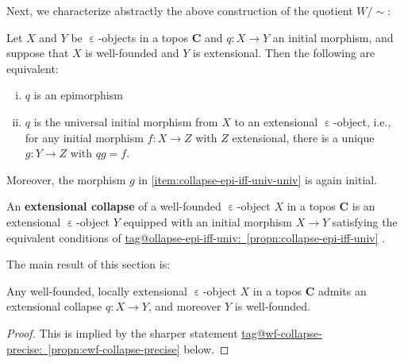\documentclass{amsart}
\makeatletter
\newcommand\bC{\mathbf{C}}
\newcommand\defword[1]{{\boldmath \textbf{#1}}}
\newcommand\ein{\mathrel{\varepsilon}}
\newcommand\unein{{\ein}}
\newcommand\unsim{{\sim}}
\newcommand\prooflabel[1]{\gdef\proof@label{#1}}
\def\proof@label{}
\newcommand\tagword[1]{\csname tag@#1\endcsname}
\def\label@tag#1:#2\@nil{#1}
\newcommand\labeltag[1]{\label@tag#1:\@nil}
\newcommand\jref[1]{%
  \texorpdfstring%
    {\hyperref[#1]{\tagword{\labeltag{#1}}~\ref*{#1}}}%
    {\tagword{\labeltag{#1}}~\ref*{#1}}%
}
\theoremstyle{definition}
\theoremstyle{remark}
\theoremstyle{plainwithref}
\makeatother
\begin{document}
Next, we characterize abstractly the above construction of the quotient \( W / \unsim \):
\prooflabel{proof:collapse-epi-iff-univ}
\begin{propn} \label{propn:collapse-epi-iff-univ}
  Let \( X \) and \( Y \) be \( \unein \)-objects in a topos \( \bC \) and \( q \colon X \to Y \) an initial morphism, and suppose that \( X \) is well-founded and \( Y \) is extensional.
  Then the following are equivalent:
  \begin{enumerate}[(i)]
  \item \( q \) is an epimorphism
  \item \label{item:collapse-epi-iff-univ-univ} \( q \) is the universal initial morphism from \( X \) to an extensional \( \unein \)-object, i.e., for any initial morphism \( f \colon X \to Z \) with \( Z \) extensional, there is a unique \( g \colon Y \to Z \) with \( q g = f \).
  \end{enumerate}
  Moreover, the morphism \( g \) in \ref{item:collapse-epi-iff-univ-univ} is again initial.
\end{propn}

\begin{defn}
  An \defword{extensional collapse} of a well-founded \( \unein \)-object \( X \) in a topos \( \bC \) is an extensional \( \unein \)-object \( Y \) equipped with an initial morphism \( X \to Y \) satisfying the equivalent conditions of \jref{propn:collapse-epi-iff-univ}.
\end{defn}

The main result of this section is:
\begin{propn} \label{propn:ewf-collapse}
  Any well-founded, locally extensional \( \unein \)-object \( X \) in a topos \( \bC \) admits an extensional collapse \( q \colon X \to Y \), and moreover \( Y \) is well-founded.
\end{propn}
\begin{proof}
  This is implied by the sharper statement \jref{propn:ewf-collapse-precise} below.
\end{proof}
\end{document}
